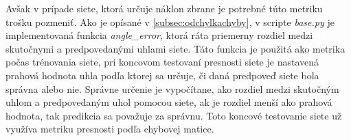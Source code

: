 Avšak v prípade siete, ktorá určuje náklon zbrane je potrebné túto metriku trošku pozmeniť.
Ako je opísané v \ref{subsec:odchylkachyby}, v scripte \textit{base.py} je implementovaná funkcia \textit{angle\_error}, ktorá ráta priemerny rozdiel medzi
    skutočnymi a predpovedanými uhlami siete.
Táto funkcia je použitá ako metrika počas trénovania siete, pri koncovom testovaní presnosti siete je nastavená prahová hodnota uhla podľa ktorej sa určuje,
    či daná predpoveď siete bola správna alebo nie.
Správne určenie je vypočítane, ako rozdiel medzi skutočným uhlom a predpovedaným uhol pomocou siete, ak je rozdiel menší ako prahová hodnota, tak predikcia
    sa považuje za správnu.
Toto koncové testovanie siete už využíva metriku presnosti podľa chybovej matice.
